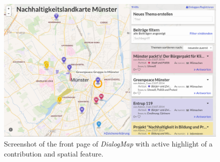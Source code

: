 \begin{figure}[!h]
    \centering
    \includegraphics[width=1\columnwidth]{images/screenshot}
    \caption{Screenshot of the front page of \textit{DialogMap} with active highlight of a contribution and spatial feature.}
    \label{fig:screenshot}
\end{figure}



